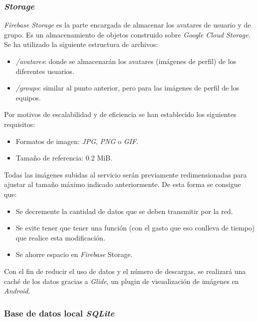 \documentclass[twoside]{report}
\begin{document}
\subsubsection{\textit{Storage}}

\textit{Firebase Storage} es la parte encargada de almacenar los avatares de usuario y de grupo. Es un almacenamiento de objetos construido sobre \textit{Google Cloud Storage}. \\

Se ha utilizado la siguiente estructura de archivos:
\begin{itemize}

\item \textit{/avatares}: donde se almacenarán los avatares (imágenes de perfil) de los diferentes usuarios. 

\item \textit{/groups}: similar al punto anterior, pero para las imágenes de perfil de los equipos. 

\end{itemize}

Por motivos de escalabilidad y de eficiencia se han establecido los siguientes requisitos:
\begin{itemize}
\item Formatos de imagen: \textit{JPG}, \textit{PNG} o \textit{GIF}.
\item Tamaño de referencia: 0.2 MiB.
\end{itemize}

Todas las imágenes subidas al servicio serán previamente redimensionadas para ajustar al tamaño máximo indicado anteriormente. De esta forma se consigue que:

\begin{itemize}
\item Se decremente la cantidad de datos que se deben transmitir por la red.
\item Se evite tener que tener una función (con el gasto que eso conlleva de tiempo) que realice esta modificación.
\item Se ahorre espacio en \textit{Firebase} Storage.
\end{itemize}

Con el fin de reducir el uso de datos y el número de descargas, se realizará una caché de los datos gracias a \textit{Glide}, un plugin de visualización de imágenes en \textit{Android}.

\subsubsection{Base de datos local \textit{SQLite}}
\end{document}
